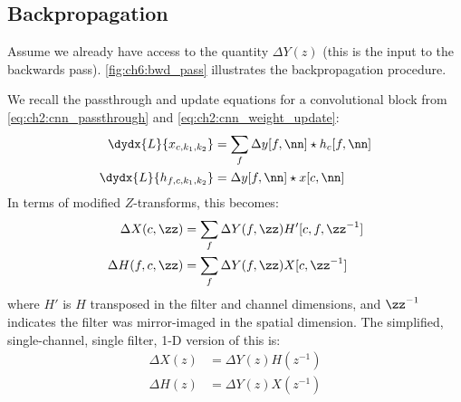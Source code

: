 \begin{figure}[t]
  \centering
  \hspace{1cm}
  \label{fig:ch6:dtcwt_bands}
\end{figure}

\subsection{Backpropagation}\label{sec:ch6:dtcwt_update}
Assume we already have access to the quantity $\Delta Y(z)$ (this is the input
to the backwards pass). \autoref{fig:ch6:bwd_pass} illustrates the
backpropagation procedure.

We recall the passthrough and update equations for a convolutional block from
\eqref{eq:ch2:cnn_passthrough} and \eqref{eq:ch2:cnn_weight_update}:
\begin{align}
  \dydx{L}{x_{c,k_1,k_2}} &= \sum_f \Delta y[f, \nn] \star h_c[f, \nn] \\
  \dydx{L}{h_{f,c,k_1,k_2}} &= \Delta y[f, \nn] \star x[c, \nn]
\end{align}
In terms of modified $Z$-transforms, this becomes:
\begin{align}
  \Delta X(c, \zz) &= \sum_f \Delta Y(f, \zz) H'[c, f, \zz^{-1}] \\
  \Delta H(f, c, \zz) &= \sum_f \Delta Y(f, \zz) X[c, \zz^{-1}] 
\end{align}
where $H'$ is
$H$ transposed in the filter and channel dimensions, and $\zz^{-1}$ indicates
the filter was mirror-imaged in the spatial dimension.  %
The simplified, single-channel, single filter, 1-D version of this is:
\begin{align}\label{eq:ch6:backprop}
  \Delta X(z) &=  \Delta Y(z)H(z^{-1}) \\
  \Delta H(z) &=  \Delta Y(z)X(z^{-1})
\end{align}

